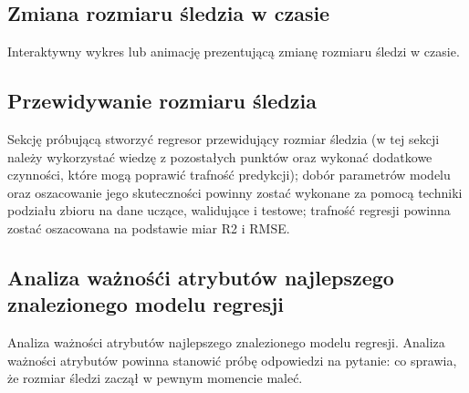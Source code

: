 \documentclass[]{article}
\begin{document}
\hypertarget{zmiana-rozmiaru-ux15bledzia-w-czasie}{%
\subsection{Zmiana rozmiaru śledzia w czasie
}\label{zmiana-rozmiaru-ux15bledzia-w-czasie}}

Interaktywny wykres lub animację prezentującą zmianę rozmiaru śledzi w
czasie.

\hypertarget{przewidywanie-rozmiaru-ux15bledzia}{%
\subsection{Przewidywanie rozmiaru śledzia
}\label{przewidywanie-rozmiaru-ux15bledzia}}

Sekcję próbującą stworzyć regresor przewidujący rozmiar śledzia (w tej
sekcji należy wykorzystać wiedzę z pozostałych punktów oraz wykonać
dodatkowe czynności, które mogą poprawić trafność predykcji); dobór
parametrów modelu oraz oszacowanie jego skuteczności powinny zostać
wykonane za pomocą techniki podziału zbioru na dane uczące, walidujące i
testowe; trafność regresji powinna zostać oszacowana na podstawie miar
R2 i RMSE.

\hypertarget{analiza-waux17cnoux15bux107i-atrybutuxf3w-najlepszego-znalezionego-modelu-regresji}{%
\subsection{Analiza ważnośći atrybutów najlepszego znalezionego modelu
regresji
}\label{analiza-waux17cnoux15bux107i-atrybutuxf3w-najlepszego-znalezionego-modelu-regresji}}

Analiza ważności atrybutów najlepszego znalezionego modelu regresji.
Analiza ważności atrybutów powinna stanowić próbę odpowiedzi na pytanie:
co sprawia, że rozmiar śledzi zaczął w pewnym momencie maleć.
\end{document}
